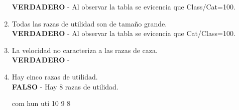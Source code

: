 \documentclass[letterpaper, 12pt]{article}
\begin{document}
\begin{enumerate}[resume]
\textbf{VERDADERO} - Al observar la tabla se evicencia que Class/Cat=100.
\item Todas las razas de utilidad son de tamaño grande.\\
\textbf{VERDADERO} - Al observar la tabla se evicencia que Cat/Class=100.
\item La velocidad no caracteriza a las razas de caza.\\
\textbf{VERDADERO} - 
\item Hay cinco razas de utilidad.\\
\textbf{FALSO} - Hay 8 razas de utilidad.
\begin{Schunk}
\begin{Soutput}
com hun uti 
 10   9   8 
\end{Soutput}
\end{Schunk}
\end{enumerate}
\end{document}
